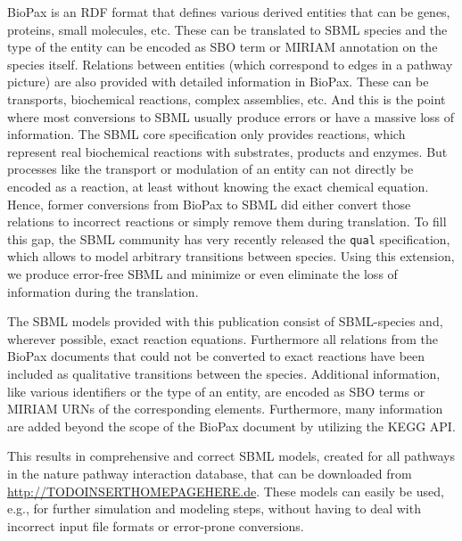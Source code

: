 \documentclass{bioinfo}
\begin{document}
BioPax is an RDF format that defines various derived entities that can be genes, proteins, small molecules, etc. These can be translated to SBML species and the type of the entity can be encoded as SBO term or MIRIAM annotation on the species itself. Relations between entities (which correspond to edges in a pathway picture) are also provided with detailed information in BioPax. These can be transports, biochemical reactions, complex assemblies, etc. And this is the point where most conversions to SBML usually produce errors or have a massive loss of information. The SBML core specification only provides reactions, which represent real biochemical reactions with substrates, products and enzymes. But processes like the transport or modulation of an entity can not directly be encoded as a reaction, at least without knowing the exact chemical equation. Hence, former conversions from BioPax to SBML did either convert those relations to incorrect reactions or simply remove them during translation. To fill this gap, the SBML community has very recently released the \texttt{qual} specification, which allows to model arbitrary transitions between species. Using this extension, we produce error-free SBML and minimize or even eliminate the loss of information during the translation.

The SBML models provided with this publication consist of SBML-species and, wherever possible, exact reaction equations. Furthermore all relations from the BioPax documents that could not be converted to exact reactions have been included as qualitative transitions between the species. Additional information, like various identifiers or the type of an entity, are encoded as SBO terms or MIRIAM URNs of the corresponding elements. Furthermore, many information are added beyond the scope of the BioPax document by utilizing the KEGG API.

This results in comprehensive and correct SBML models, created for all pathways in the nature pathway interaction database, that can be downloaded from \href{http://TODO_INSERT_HOMEPAGE_HERE.de}{http://TODOINSERTHOMEPAGEHERE.de}. These models can easily be used, e.g., for further simulation and modeling steps, without having to deal with incorrect input file formats or error-prone conversions.

\end{document}
